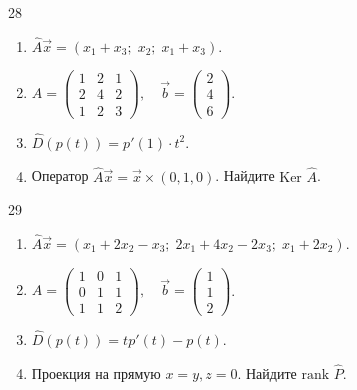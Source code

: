 \documentclass[12pt,a4paper]{article}
\theoremstyle{plain}
\theoremstyle{definition}
\begin{document}
\begin{taskbox}{28}
    \begin{enumerate}
        \item $\hat{A}\vec{x} = (x_1 + x_3; \; x_2; \; x_1 + x_3)$.
        \item $A = \begin{pmatrix} 1 & 2 & 1 \\ 2 & 4 & 2 \\ 1 & 2 & 3 \end{pmatrix}, \quad \vec{b} = \begin{pmatrix} 2 \\ 4 \\ 6 \end{pmatrix}$.
        \item $\hat{D}(p(t)) = p'(1) \cdot t^2$.
        \item Оператор $\hat{A}\vec{x} = \vec{x} \times (0,1,0)$. Найдите $\text{Ker } \hat{A}$.
    \end{enumerate}
\end{taskbox}

\begin{taskbox}{29}
    \begin{enumerate}
        \item $\hat{A}\vec{x} = (x_1 + 2x_2 - x_3; \; 2x_1 + 4x_2 - 2x_3; \; x_1 + 2x_2)$.
        \item $A = \begin{pmatrix} 1 & 0 & 1 \\ 0 & 1 & 1 \\ 1 & 1 & 2 \end{pmatrix}, \quad \vec{b} = \begin{pmatrix} 1 \\ 1 \\ 2 \end{pmatrix}$.
        \item $\hat{D}(p(t)) = t p'(t) - p(t)$.
        \item Проекция на прямую $x=y, z=0$. Найдите $\text{rank } \hat{P}$.
    \end{enumerate}
\end{taskbox}
\end{document}
